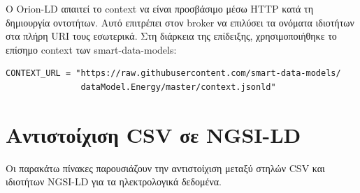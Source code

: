 Ο \textlatin{Orion-LD} απαιτεί το \textlatin{context} να είναι προσβάσιμο
μέσω \textlatin{HTTP} κατά τη δημιουργία οντοτήτων. Αυτό επιτρέπει στον
\textlatin{broker} να επιλύσει τα ονόματα ιδιοτήτων στα πλήρη
\textlatin{URI} τους εσωτερικά. Στη διάρκεια της επίδειξης, χρησιμοποιήθηκε
το επίσημο \textlatin{context} των \textlatin{smart-data-models}:

\begin{lstlisting}[language={}]
CONTEXT_URL = "https://raw.githubusercontent.com/smart-data-models/
               dataModel.Energy/master/context.jsonld"
\end{lstlisting}

\section{Αντιστοίχιση \textlatin{CSV} σε \textlatin{NGSI-LD}}
\label{sec:csv-mapping}

Οι παρακάτω πίνακες  παρουσιάζουν την αντιστοίχιση μεταξύ
στηλών \textlatin{CSV} και ιδιοτήτων \textlatin{NGSI-LD} για τα ηλεκτρολογικά
δεδομένα.

